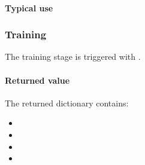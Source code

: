 \documentclass[letterpaper,10pt,english,openany,oneside]{sphinxmanual}
\begin{document}
\paragraph{Typical use}
\label{\detokenize{api/package/execution/building:typical-use}}
\begin{sphinxVerbatim}[commandchars=\\\{\}]
\end{sphinxVerbatim}

\sphinxstepscope


\subsubsection{Training}
\label{\detokenize{api/package/execution/training:training}}\label{\detokenize{api/package/execution/training::doc}}
\sphinxAtStartPar
The training stage is triggered with {\hyperref[\detokenize{api/package/object:nlpoptnet.api.NLPOptNet.optimize}]{}}.


\paragraph{Returned value}
\label{\detokenize{api/package/execution/training:returned-value}}
\begin{sphinxVerbatim}[commandchars=\\\{\}]
  

\PYG{p}{[}\PYG{p}{]}
\PYG{p}{[}\PYG{p}{]}
\end{sphinxVerbatim}

\sphinxAtStartPar
The returned dictionary contains:
\begin{itemize}
\item {} 
\sphinxAtStartPar
{}

\item {} 
\sphinxAtStartPar
{}

\item {} 
\sphinxAtStartPar
{}

\item {} 
\sphinxAtStartPar
{}

\end{itemize}
\end{document}
